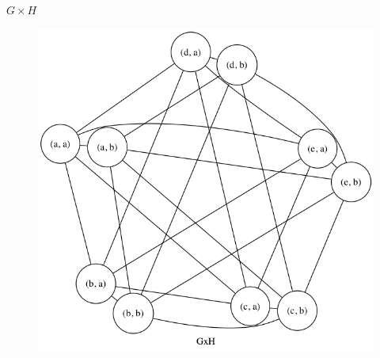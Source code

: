\begin{enumerate}[(a)]
\begin{figure}[H]
    \end{figure}
    $G \times H$
    \begin{figure}[H]
    \centering
    \includegraphics[scale=0.5]{115/115aGH2.png}
    \end{figure}



\end{enumerate}
